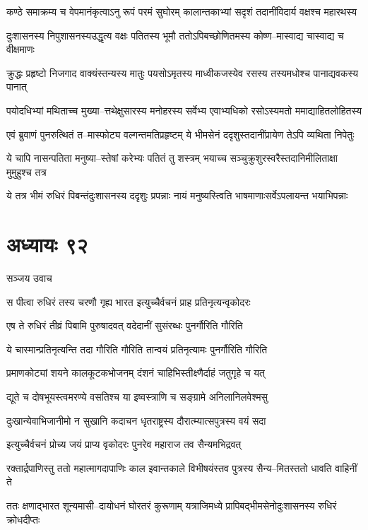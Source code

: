 \twolineshloka
{कण्ठे समाक्रम्य च वेपमानंकृत्वाऽनु रूपं परमं सुघोरम्}
{कालान्तकाभ्यां सदृशं तदानींविदार्य वक्षश्च महारथस्य}


\twolineshloka
{दुःशासनस्य निपुशासनस्यउद्धृत्य वक्षः पतितस्य भूमौ}
{ततोऽपिबच्छोणितमस्य कोष्ण--मास्वाद्य चास्वाद्य च वीक्षमाणः}


\twolineshloka
{क्रुद्धः प्रहृष्टो निजगाद वाक्यंस्तन्यस्य मातुः पयसोऽमृतस्य}
{माध्वीकजस्येव रसस्य तस्यमधोश्च पानाद्यवकस्य पानात्}


\twolineshloka
{पयोदधिभ्यां मथिताच्च मुख्या--त्तथेक्षुसारस्य मनोहरस्य}
{सर्वेभ्य एवाभ्यधिको रसोऽस्यमतो ममाद्याहितलोहितस्य}


\twolineshloka
{एवं ब्रुवाणं पुनरुत्थितं त--मास्फोट्य वल्गन्तमतिप्रहृष्टम्}
{ये भीमसेनं ददृशुस्तदानींप्रायेण तेऽपि व्यथिता निपेतुः}


\twolineshloka
{ये चापि नासन्पतिता मनुष्या--स्तेषां करेभ्यः पतितं तु शस्त्रम्}
{भयाच्च सञ्चुक्रुशुरस्वरैस्तदानिमीलिताक्षा मुमुहुश्च तत्र}


\twolineshloka
{ये तत्र भीमं रुधिरं पिबन्तंदुःशासनस्य ददृशुः प्रपन्नाः}
{नायं मनुष्यस्त्विति भाषमाणाःसर्वेऽपलायन्त भयाभिपन्नाः}


\chapter{अध्यायः ९२}
\twolineshloka
{सञ्जय उवाच}
{}


\twolineshloka
{स पीत्वा रुधिरं तस्य चरणौ गृह्य भारत}
{इत्युच्चैर्वचनं प्राह प्रतिनृत्यन्वृकोदरः}


\twolineshloka
{एष ते रुधिरं तीव्रं पिबामि पुरुषादवत्}
{वदेदानीं सुसंरब्धः पुनर्गौरिति गौरिति}


\twolineshloka
{ये चास्मान्प्रतिनृत्यन्ति तदा गौरिति गौरिति}
{तान्वयं प्रतिनृत्यामः पुनर्गौरिति गौरिति}


\twolineshloka
{प्रमाणकोट्यां शयने कालकूटकभोजनम्}
{दंशनं चाहिभिस्तीक्ष्णैर्दाहं जतुगृहे च यत्}


\twolineshloka
{द्यूते च दोषभूयस्त्वमरण्ये वसतिश्च या}
{इष्वस्त्राणि च सङ्ग्रामे अनिलानिलवेश्मसु}


\twolineshloka
{दुःखान्येवाभिजानीमो न सुखानि कदाचन}
{धृतराष्ट्रस्य दौरात्म्यात्सपुत्रस्य वयं सदा}


\twolineshloka
{इत्युच्चैर्वचनं प्रोच्य जयं प्राप्य वृकोदरः}
{पुनरेव महाराज तव सैन्यमभिद्रवत्}


\twolineshloka
{रक्तार्द्रपाणिस्तु ततो महात्मागदापाणिः काल इवान्तकाले}
{विभीषयंस्तव पुत्रस्य सैन्य--मितस्ततो धावति वाहिनीं ते}


\twolineshloka
{ततः क्षणाद्भारत शून्यमासी--दायोधनं घोरतरं कुरूणाम्}
{यत्राजिमध्ये प्रापिबद्भीमसेनोदुःशासनस्य रुधिरं क्रोधदीप्तः}


